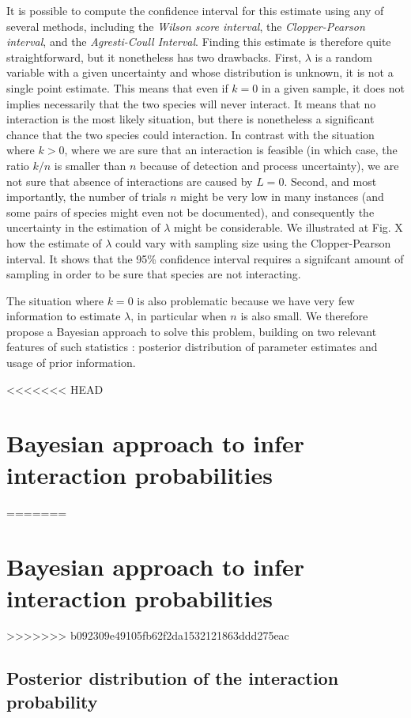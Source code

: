 \documentclass[12pt]{article}
\begin{document}
It is possible to compute the confidence interval for this estimate using any of several methods, including the \emph{Wilson score interval}, the \emph{Clopper-Pearson interval}, and the \emph{Agresti-Coull Interval}. Finding this estimate is therefore quite straightforward, but it nonetheless has two drawbacks. First, $\lambda$ is a random variable with a given uncertainty and whose distribution is unknown, it is not a single point estimate. This means that even if $k = 0$ in a given sample, it does not implies necessarily that the two species will never interact. It means that no interaction is the most likely situation, but there is nonetheless a significant chance that the two species could interaction. In contrast with the situation where $k>0$, where we are sure that an interaction is feasible (in which case, the ratio $k/n$ is smaller than $n$ because of detection and process uncertainty), we are not sure that absence of interactions are caused by $L=0$. Second, and most importantly, the number of trials $n$ might be very low in many instances (and some pairs of species might even not be documented), and consequently the uncertainty in the estimation of $\lambda$ might be considerable. We illustrated at Fig. X how the estimate of $\lambda$ could vary with sampling size using the Clopper-Pearson interval. It shows that the 95\% confidence interval requires a signifcant amount of sampling in order to be sure that species are not interacting. 

The situation where $k = 0$ is also problematic because we have very few information to estimate $\lambda$, in particular when $n$ is also small. We therefore propose a Bayesian approach to solve this problem, building on two relevant features of such statistics : posterior distribution of parameter estimates and usage of prior information. 

<<<<<<< HEAD


\section*{Bayesian approach to infer interaction probabilities}
=======
 \section*{Bayesian approach to infer interaction probabilities}
>>>>>>> b092309e49105fb62f2da1532121863ddd275eac

    \subsection*{Posterior distribution of the interaction probability}
\end{document}
